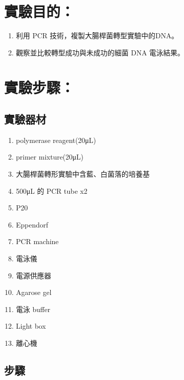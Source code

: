 \setlength{\parindent}{2em} %

\section{實驗目的：}
\begin{enumerate}[label=\arabic*.]
  \item 利用 PCR 技術，複製大腸桿菌轉型實驗中的DNA。
  \item 觀察並比較轉型成功與未成功的細菌 DNA 電泳結果。

\end{enumerate}



\section{實驗步驟：}

\subsection*{實驗器材}

\begin{multicols}{2}
  \begin{enumerate}[label=\arabic*.]
    \item polymerase reagent(20μL)
    \item primer mixture(20μL)
    \item 大腸桿菌轉形實驗中含藍、白菌落的培養基
    \item 500μL 的 PCR tube x2
    \item P20
    \item Eppendorf
    \item PCR machine
    \item 電泳儀
    \item 電源供應器
    \item Agarose gel
    \item 電泳 buffer
    \item Light box
    \item 離心機
  
  \end{enumerate}  
\end{multicols}

\subsection*{步驟}

